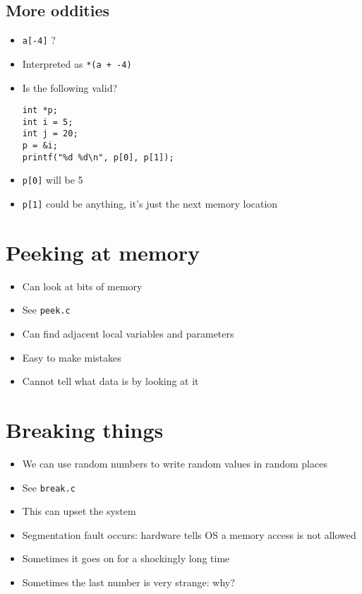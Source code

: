 \documentclass{article}
\begin{document}
\subsection{More oddities}
\begin{itemize}
\item \verb!a[-4]! ?
\item Interpreted as \verb!*(a + -4)!

\item Is the following valid?
\begin{verbatim}
int *p;
int i = 5;
int j = 20;
p = &i;
printf("%d %d\n", p[0], p[1]);
\end{verbatim}

\item \texttt{p[0]} will be 5
\item \texttt{p[1]} could be anything, it's just the next memory location
\end{itemize}



\section{Peeking at memory}
\begin{itemize}
\item Can look at bits of memory
\item See \verb!peek.c!
\item Can find adjacent local variables and parameters
\item Easy to make mistakes
\item Cannot tell what data is by looking at it
\end{itemize}



\section{Breaking things}
\begin{itemize}
\item We can use random numbers to write random values in random places
\item See \verb!break.c!
\item This can upset the system
\item Segmentation fault occurs: hardware tells OS a memory access is not allowed
\item Sometimes it goes on for a shockingly long time
\item Sometimes the last number is very strange: why?
\end{itemize}
\end{document}
